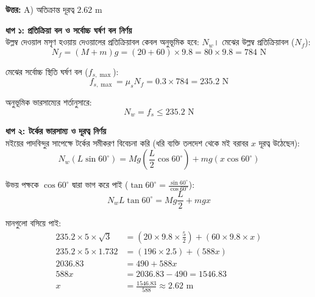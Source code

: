 \documentclass[12pt, a4paper]{article}
\begin{document}
\vspace{0.5em}
\begin{tcolorbox}[answerbox]
    \textbf{\color{success} উত্তর:} A) অতিক্রান্ত দূরত্ব $2.62\text{ m}$
\end{tcolorbox}
\vspace{1em}

\begin{tcolorbox}[solutionbox={সমাধান (Solution)}]
    \noindent
    \textbf{ধাপ ১: প্রতিক্রিয়া বল ও সর্বোচ্চ ঘর্ষণ বল নির্ণয়} \\
    উল্লম্ব দেওয়াল মসৃণ হওয়ায় দেওয়ালের প্রতিক্রিয়াবল কেবল অনুভূমিক হবে: $N_w$। 
    মেঝের উল্লম্ব প্রতিক্রিয়াবল ($N_f$):
    \[ N_f = (M + m) g = (20 + 60) \times 9.8 = 80 \times 9.8 = 784\text{ N} \]
    
    মেঝের সর্বোচ্চ স্থিতি ঘর্ষণ বল ($f_{s,\max}$):
    \[ f_{s,\max} = \mu_s N_f = 0.3 \times 784 = 235.2\text{ N} \]
    
    অনুভূমিক ভারসাম্যের শর্তানুসারে:
    \[ N_w = f_s \le 235.2\text{ N} \]
    
    \vspace{0.5em}
    \noindent\textbf{ধাপ ২: টর্কের ভারসাম্য ও দূরত্ব নির্ণয়} \\
    মইয়ের পাদবিন্দুর সাপেক্ষে টর্কের সমীকরণ বিবেচনা করি (ধরি ব্যক্তি তলদেশ থেকে মই বরাবর $x$ দূরত্ব উঠেছেন):
    \[ N_w (L \sin 60^\circ) = M g \left(\frac{L}{2} \cos 60^\circ\right) + m g (x \cos 60^\circ) \]
    
    উভয় পক্ষকে $\cos 60^\circ$ দ্বারা ভাগ করে পাই ($\tan 60^\circ = \frac{\sin 60^\circ}{\cos 60^\circ}$):
    \[ N_w L \tan 60^\circ = M g \frac{L}{2} + m g x \]
    
    মানগুলো বসিয়ে পাই:
    \begin{align*}
        235.2 \times 5 \times \sqrt{3} &= \left(20 \times 9.8 \times \frac{5}{2}\right) + (60 \times 9.8 \times x) \\
        235.2 \times 5 \times 1.732 &= (196 \times 2.5) + (588 x) \\
        2036.83 &= 490 + 588 x \\
        588 x &= 2036.83 - 490 = 1546.83 \\
        x &= \frac{1546.83}{588} \approx \mathbf{2.62}\text{ m}
    \end{align*}
\end{tcolorbox}
\newpage
\end{document}

